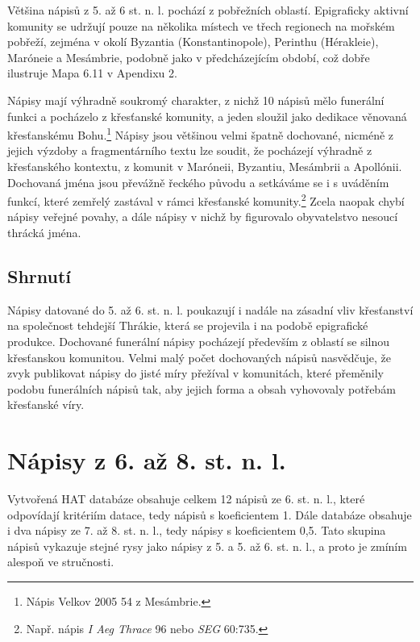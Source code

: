 \NC\AR
\HL
\HL
\stoptable

Většina nápisů z 5. až 6 st. n. l. pochází z pobřežních oblastí. Epigraficky aktivní komunity se udržují pouze na několika místech ve třech regionech na mořském pobřeží, zejména v okolí Byzantia (Konstantinopole), Perinthu (Hérakleie), Maróneie a Mesámbrie, podobně jako v předcházejícím období, což dobře ilustruje Mapa 6.11 v Apendixu 2.

Nápisy mají výhradně soukromý charakter, z nichž 10 nápisů mělo funerální funkci a pocházelo z křesťanské komunity, a jeden sloužil jako dedikace věnovaná křesťanskému Bohu.\footnote{Nápis Velkov 2005 54 z Mesámbrie.} Nápisy jsou většinou velmi špatně dochované, nicméně z jejich výzdoby a fragmentárního textu lze soudit, že pocházejí výhradně z křesťanského kontextu, z komunit v Maróneii, Byzantiu, Mesámbrii a Apollónii. Dochovaná jména jsou převážně řeckého původu a setkáváme se i s uváděním funkcí, které zemřelý zastával v rámci křesťanské komunity.\footnote{Např. nápis {\em I Aeg Thrace} 96 nebo {\em SEG} 60:735.} Zcela naopak chybí nápisy veřejné povahy, a dále nápisy v nichž by figurovalo obyvatelstvo nesoucí thrácká jména.

\subsection[shrnutí-24]{Shrnutí}

Nápisy datované do 5. až 6. st. n. l. poukazují i nadále na zásadní vliv křesťanství na společnost tehdejší Thrákie, která se projevila i na podobě epigrafické produkce. Dochované funerální nápisy pocházejí především z oblastí se silnou křesťanskou komunitou. Velmi malý počet dochovaných nápisů nasvědčuje, že zvyk publikovat nápisy do jisté míry přežíval v komunitách, které přeměnily podobu funerálních nápisů tak, aby jejich forma a obsah vyhovovaly potřebám křesťanské víry.

\section[nápisy-z-6.-až-8.-st.-n.-l.]{Nápisy z 6. až 8. st. n. l.}

Vytvořená HAT databáze obsahuje celkem 12 nápisů ze 6. st. n. l., které odpovídají kritériím datace, tedy nápisů s koeficientem 1. Dále databáze obsahuje i dva nápisy ze 7. až 8. st. n. l., tedy nápisy s koeficientem 0,5. Tato skupina nápisů vykazuje stejné rysy jako nápisy z 5. a 5. až 6. st. n. l., a proto je zmíním alespoň ve stručnosti.

